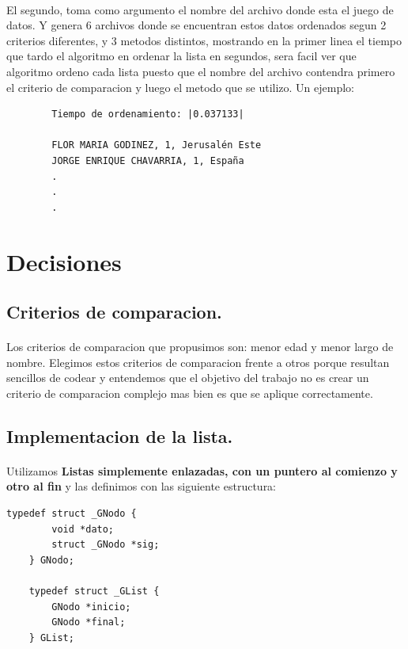 \documentclass{article}
\begin{document}
	\paragraph{}
	El segundo, toma como argumento el nombre del archivo donde esta el juego de datos. Y genera 6 archivos donde se encuentran estos datos ordenados segun 2 criterios diferentes, y 3 metodos distintos, mostrando en la primer linea el tiempo que tardo el algoritmo en ordenar la lista en segundos, sera facil ver que algoritmo ordeno cada lista puesto que el nombre del archivo contendra primero el criterio de comparacion y luego el metodo que se utilizo. Un ejemplo:
	\begin{verbatim}
		Tiempo de ordenamiento: |0.037133|
		
		FLOR MARIA GODINEZ, 1, Jerusalén Este
		JORGE ENRIQUE CHAVARRIA, 1, España
		.
		.
		.
	\end{verbatim}
	\section{Decisiones}
	\subsection{Criterios de comparacion.}
	\paragraph{}
	Los criterios de comparacion que propusimos son: menor edad y menor largo de nombre. Elegimos estos criterios de comparacion frente a otros porque resultan sencillos de codear y entendemos que el objetivo del trabajo no es crear un criterio de comparacion complejo mas bien es que se aplique correctamente.
		
	\subsection{Implementacion de la lista.}
	\paragraph{}
	Utilizamos \textbf{Listas simplemente enlazadas, con un puntero al comienzo y otro al fin} y las definimos con las siguiente estructura:
	\begin{lstlisting}[style=CStyle]
	typedef struct _GNodo {
		void *dato;
		struct _GNodo *sig;
	} GNodo;
			
	typedef struct _GList {
		GNodo *inicio;
		GNodo *final;
	} GList;	
	\end{lstlisting}
\end{document}
